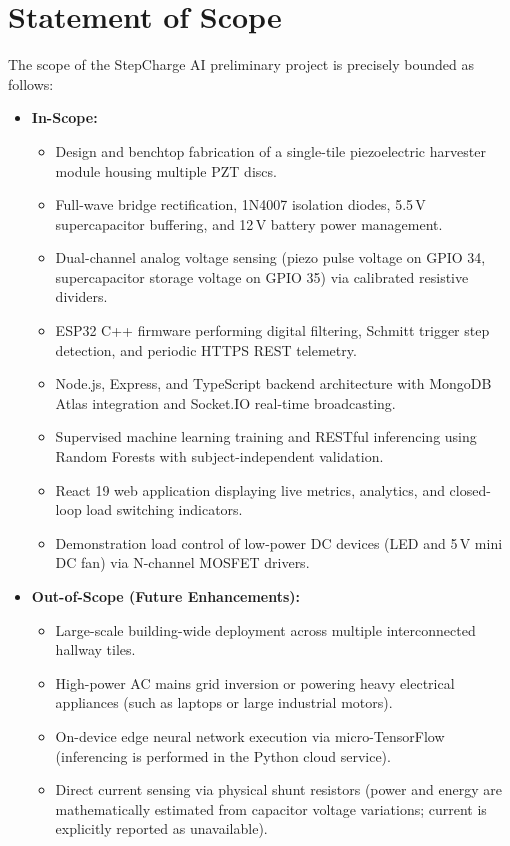 \section{Statement of Scope}
The scope of the StepCharge AI preliminary project is precisely bounded as follows:
\begin{itemize}
    \item \textbf{In-Scope:}
    \begin{itemize}
        \item Design and benchtop fabrication of a single-tile piezoelectric harvester module housing multiple PZT discs.
        \item Full-wave bridge rectification, 1N4007 isolation diodes, 5.5\,V supercapacitor buffering, and 12\,V battery power management.
        \item Dual-channel analog voltage sensing (piezo pulse voltage on GPIO 34, supercapacitor storage voltage on GPIO 35) via calibrated resistive dividers.
        \item ESP32 C++ firmware performing digital filtering, Schmitt trigger step detection, and periodic HTTPS REST telemetry.
        \item Node.js, Express, and TypeScript backend architecture with MongoDB Atlas integration and Socket.IO real-time broadcasting.
        \item Supervised machine learning training and RESTful inferencing using Random Forests with subject-independent validation.
        \item React 19 web application displaying live metrics, analytics, and closed-loop load switching indicators.
        \item Demonstration load control of low-power DC devices (LED and 5\,V mini DC fan) via N-channel MOSFET drivers.
    \end{itemize}
    \item \textbf{Out-of-Scope (Future Enhancements):}
    \begin{itemize}
        \item Large-scale building-wide deployment across multiple interconnected hallway tiles.
        \item High-power AC mains grid inversion or powering heavy electrical appliances (such as laptops or large industrial motors).
        \item On-device edge neural network execution via micro-TensorFlow (inferencing is performed in the Python cloud service).
        \item Direct current sensing via physical shunt resistors (power and energy are mathematically estimated from capacitor voltage variations; current is explicitly reported as unavailable).
    \end{itemize}
\end{itemize}

